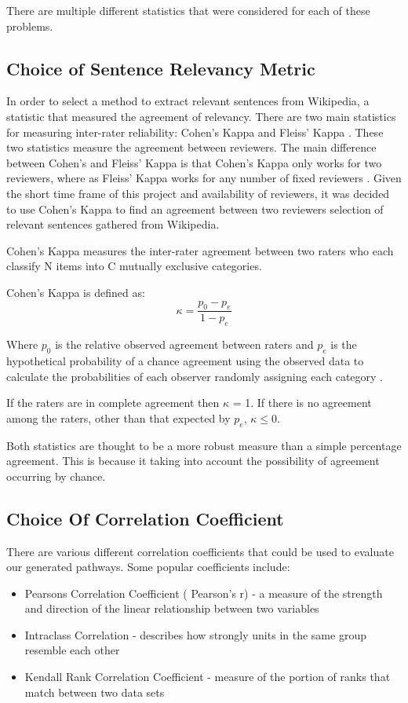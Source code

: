 \documentclass[bsc,frontabs,twoside,singlespacing,parskip,deptreport]{infthesis}     %
\begin{document}
There are multiple different statistics that were considered for each of these problems.
\subsection{Choice of Sentence Relevancy Metric}\label{sec:cohen}
In order to select a method to extract relevant sentences from Wikipedia, a statistic that measured the agreement
of relevancy. There are two main statistics for measuring inter-rater reliability: Cohen's Kappa and Fleiss' Kappa \cite{}.
These two statistics measure the agreement between reviewers. The main difference between Cohen's and Fleiss' Kappa is that
Cohen's Kappa only works for two reviewers, where as Fleiss' Kappa works for any number of fixed reviewers \cite{}.
Given the short time frame of this project and availability of reviewers, it was decided to use Cohen's Kappa
to find an agreement between two reviewers selection of relevant sentences gathered from Wikipedia.

Cohen's Kappa measures the inter-rater agreement between two raters
who each classify N items into C mutually exclusive categories.

Cohen's Kappa is defined as:\\
\begin{equation}
  \kappa = \frac{p_{0} - p_{e}}{1 - p_{e}}\nonumber
\end{equation}

Where $p_0$ is the relative observed agreement between raters and $p_e$ is the hypothetical probability
of a chance agreement using the observed data to calculate the probabilities of each observer randomly assigning each category \cite{}.

If the raters are in complete agreement then $\kappa$ = 1.
If there is no agreement among the raters, other than that expected by $p_e$, $\kappa \leq 0$.

Both statistics are thought to be a more robust measure than a simple percentage agreement.
This is because it taking into account the possibility of agreement occurring by chance.

\subsection{Choice Of Correlation Coefficient}\label{sec:kendall}

There are various different correlation coefficients that could be used to evaluate our generated pathways.
Some popular coefficients include:
\begin{itemize}
\item Pearsons Correlation Coefficient ( Pearson's r) - a measure of the strength and direction of the linear relationship between two variables
\item Intraclass Correlation - describes how strongly units in the same group resemble each other
\item Kendall Rank Correlation Coefficient -  measure of the portion of ranks that match between two data sets
\end{itemize}
\end{document}
